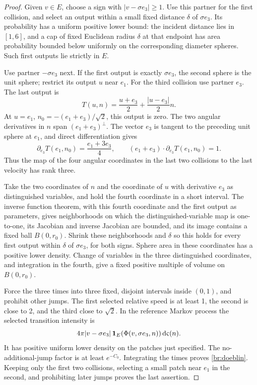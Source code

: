 \begin{proof}
Given \(v\in E\), choose a sign with \(|v-\sigma e_3|\ge1\).
Use this partner for the first collision, and select an output within
a small fixed distance \(\delta\) of \(\sigma e_3\). Its probability
has a uniform positive lower bound: the incident distance lies in
\([1,6]\), and a cap of fixed Euclidean radius \(\delta\) at that
endpoint has area probability bounded below uniformly on the
corresponding diameter spheres. Such first outputs lie strictly in \(E\).

Use partner \(-\sigma e_3\) next. If the first output is exactly
\(\sigma e_3\), the second sphere is the unit sphere; restrict its
output \(u\) near \(e_1\). For the third collision use partner \(e_3\).
The last output is
\[
T(u,n)=\frac{u+e_3}{2}+\frac{|u-e_3|}{2}n.
\]
At \(u=e_1\), \(n_0=-(e_1+e_3)/\sqrt2\), this output is zero.
The two angular derivatives in \(n\) span \((e_1+e_3)^\perp\).
The vector \(e_3\) is tangent to the preceding unit sphere at \(e_1\),
and direct differentiation gives
\begin{equation}\label{br:rank-derivative}
\partial_{e_3}T(e_1,n_0)=\frac{e_1+3e_3}{4},\qquad
(e_1+e_3)\cdot\partial_{e_3}T(e_1,n_0)=1.
\end{equation}
Thus the map of the four angular coordinates in the last two collisions
to the last velocity has rank three.

Take the two coordinates of \(n\) and the coordinate of \(u\) with
derivative \(e_3\) as distinguished variables, and hold the fourth
coordinate in a short interval. The inverse function theorem, with
this fourth coordinate and the first output as parameters, gives
neighborhoods on which the distinguished-variable map is one-to-one,
its Jacobian and inverse Jacobian are bounded, and its image contains
a fixed ball \(B(0,r_0)\). Shrink these neighborhoods and \(\delta\)
so this holds for every first output within \(\delta\) of
\(\sigma e_3\), for both signs. Sphere area in these coordinates has
a positive lower density. Change of variables in the three distinguished
coordinates, and integration in the fourth, give a fixed positive
multiple of volume on \(B(0,r_0)\).

Force the three times into three fixed, disjoint intervals inside
\((0,1)\), and prohibit other jumps. The first selected relative speed
is at least 1, the second is close to 2, and the third close to
\(\sqrt2\). In the reference Markov process the selected transition
intensity is
\[
4\pi|v-\sigma e_3|\,
\mathbf 1_E(\Phi(v,\sigma e_3,n))\,\mathrm d\varsigma(n).
\]
It has positive uniform lower density on the patches just specified.
The no-additional-jump factor is at least \(e^{-C_0}\).
Integrating the times proves \eqref{br:doeblin}. Keeping only the first
two collisions, selecting a small patch near \(e_1\) in the second,
and prohibiting later jumps proves the last assertion.
\end{proof}

